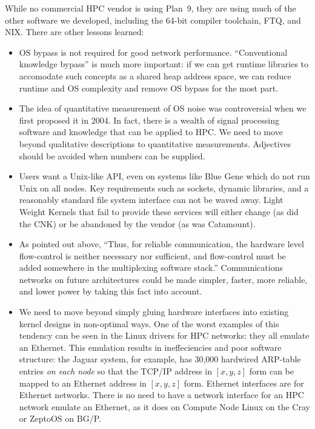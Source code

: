 \documentclass{report}
\begin{document}
While no commercial HPC vendor is using Plan~9, they are using much of the other software we developed, 
including the 64-bit compiler toolchain, FTQ, and NIX. 
There are other lessons learned: 
\begin{itemize}
\item OS bypass is not required for good network performance. ``Conventional knowledge
bypass'' is much more important: if we can get runtime libraries to accomodate 
such concepts as a shared heap address space, we can reduce runtime and OS 
complexity and remove OS bypass for the most part. 
\item The idea of quantitative measurement of OS noise was controversial when we first proposed it in 2004. 
In fact, there is a wealth of signal processing software and knowledge that can be applied to HPC. We need
to move beyond qualitative descriptions to quantitative measurements. Adjectives should be avoided
when numbers can be supplied. 
\item Users want a Unix-like API, even on systems like Blue Gene which do not run Unix on all nodes. 
Key requirements such as sockets, dynamic libraries, and a reasonably standard file system
interface can not be waved away. Light Weight Kernels that fail to provide these services
will either change (as did the CNK) or be abandoned by the vendor (as was Catamount). 
\item As pointed out above, ``Thus, for reliable communication, the hardware level flow-control is neither necessary nor sufficient, 
and flow-control must be added somewhere in the multiplexing software stack.'' Communications networks
on future architectures could be made simpler, faster, more reliable, and lower power by taking 
this fact into account. 
\item We need to move beyond simply gluing hardware interfaces into existing kernel designs in non-optimal ways. 
One of the worst examples of this tendency can be seen in the Linux drivers for HPC networks: they all emulate an Ethernet. 
This emulation results in ineffeciencies and poor software structure: 
the Jaguar system, for example, has 30,000 hardwired ARP-table entries 
{\em on each node} so that the TCP/IP address in $[x,y,z]$ form 
can be mapped to an Ethernet address in $[x,y,z]$ form. 
Ethernet interfaces are for Ethernet networks. There is no need to have a network interface for an
HPC network 
emulate an Ethernet, as it does on Compute Node Linux on the Cray or 
ZeptoOS on BG/P. 
\end{itemize}
\end{document}
